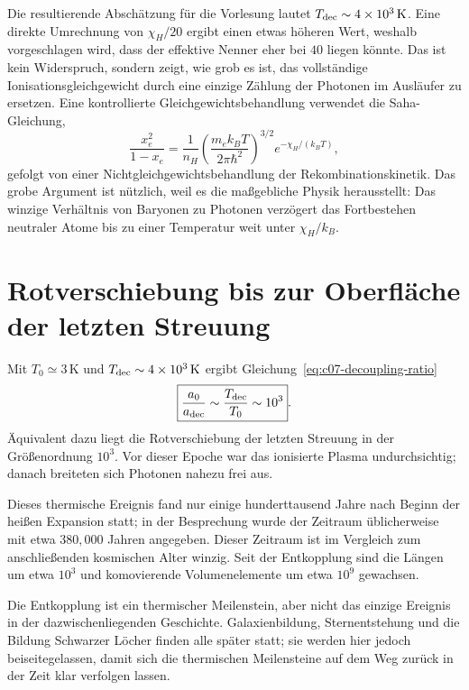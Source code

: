 Die resultierende Abschätzung für die Vorlesung lautet \(T_{\rm dec}\sim4\times10^3\,\mathrm{K}\). Eine direkte Umrechnung von \(\chi_H/20\) ergibt einen etwas höheren Wert, weshalb vorgeschlagen wird, dass der effektive Nenner eher bei \(40\) liegen könnte. Das ist kein Widerspruch, sondern zeigt, wie grob es ist, das vollständige Ionisationsgleichgewicht durch eine einzige Zählung der Photonen im Ausläufer zu ersetzen. Eine kontrollierte Gleichgewichtsbehandlung verwendet die Saha-Gleichung,
\begin{equation}
\frac{x_e^2}{1-x_e}
=
\frac{1}{n_H}
\left(\frac{m_e k_BT}{2\pi\hbar^2}\right)^{3/2}
e^{-\chi_H/(k_BT)},
\label{eq:c07-saha}
\end{equation}
gefolgt von einer Nichtgleichgewichtsbehandlung der Rekombinationskinetik. Das grobe Argument ist nützlich, weil es die maßgebliche Physik herausstellt: Das winzige Verhältnis von Baryonen zu Photonen verzögert das Fortbestehen neutraler Atome bis zu einer Temperatur weit unter \(\chi_H/k_B\).

\section{Rotverschiebung bis zur Oberfläche der letzten Streuung}

Mit \(T_0\simeq3\,\mathrm{K}\) und \(T_{\rm dec}\sim4\times10^3\,\mathrm{K}\) ergibt Gleichung~\eqref{eq:c07-decoupling-ratio}
\begin{equation}
\boxed{
\frac{a_0}{a_{\rm dec}}
\sim
\frac{T_{\rm dec}}{T_0}
\sim10^3
}.
\label{eq:c07-decoupling-expansion}
\end{equation}
Äquivalent dazu liegt die Rotverschiebung der letzten Streuung in der Größenordnung \(10^3\). Vor dieser Epoche war das ionisierte Plasma undurchsichtig; danach breiteten sich Photonen nahezu frei aus.

Dieses thermische Ereignis fand nur einige hunderttausend Jahre nach Beginn der heißen Expansion statt; in der Besprechung wurde der Zeitraum üblicherweise mit etwa \(380{,}000\) Jahren angegeben. Dieser Zeitraum ist im Vergleich zum anschließenden kosmischen Alter winzig. Seit der Entkopplung sind die Längen um etwa \(10^3\) und komovierende Volumenelemente um etwa \(10^9\) gewachsen.

Die Entkopplung ist ein thermischer Meilenstein, aber nicht das einzige Ereignis in der dazwischenliegenden Geschichte. Galaxienbildung, Sternentstehung und die Bildung Schwarzer Löcher finden alle später statt; sie werden hier jedoch beiseitegelassen, damit sich die thermischen Meilensteine auf dem Weg zurück in der Zeit klar verfolgen lassen.


